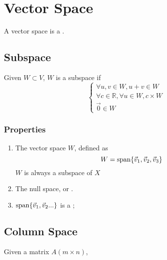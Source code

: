 \section{Vector Space}

\begin{definition}
  A vector space is a .
\end{definition}

\subsection{Subspace}
  
  Given $ W \subset V $, $ W $ is a subspace if 
  \begin{displaymath}
    \begin{cases}
      \forall u, v \in W, u + v \in W \\ 
      \forall c \in \mathbb{R}, \forall u \in W, c \times W \\ 
      \vec{0} \in W
    \end{cases}
  \end{displaymath}
  
  \subsubsection{Properties}
    \begin{enumerate} 
      \item The vector space $ W $, defined as 
      \begin{displaymath}
        W = \operatorname{span} \{ \vec{v}_{1}, \vec{v}_{2}, \vec{v}_{3} \}
      \end{displaymath}
      $ W $ is always a subspace of $ X $
      
      \item The  null space, 
      or .
      
      \item $ \operatorname{span} \{ \vec{v}_{1}, \vec{v}_{2} ... \} $ is a 
      ;
    \end{enumerate}
    
\subsection{Column Space}
  
  \begin{definition}
    Given a matrix $ A \left( m \times n \right) $, 
  \end{definition}
  
